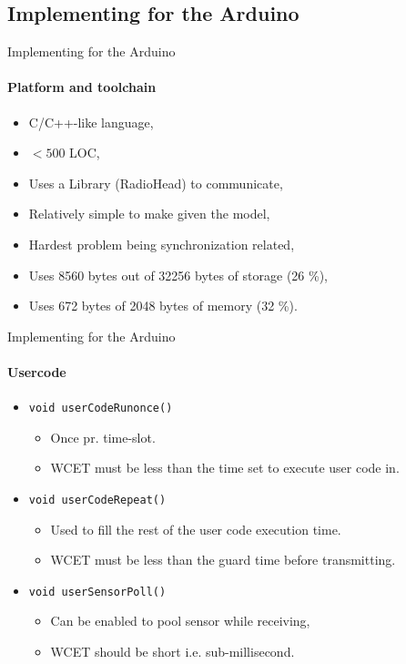     \subsection{Implementing for the Arduino}
    \begin{frame}[t]{Implementing for the Arduino}\framesubtitle{Platform and toolchain}
        \begin{itemize}
            \item C/C++-like language,
            \item $< 500$ LOC,
            \item Uses a Library (RadioHead) to communicate,
            \item Relatively simple to make given the model,
            \item Hardest problem being synchronization related,
            \item Uses 8560 bytes out of 32256 bytes of storage (26 \%),
            \item Uses 672 bytes of 2048 bytes of memory (32 \%).
        \end{itemize}

    \end{frame}
    \begin{frame}[t]{Implementing for the Arduino}\framesubtitle{Usercode}
        \begin{itemize}
            \item \texttt{void userCodeRunonce()}
            \begin{itemize}
                \item Once pr. time-slot.
                \item WCET must be less than the time set to execute user code in.
            \end{itemize}
            \item \texttt{void userCodeRepeat()}
            \begin{itemize}
                \item Used to fill the rest of the user code execution time.
                \item WCET must be less than the guard time before transmitting.
            \end{itemize}
            \item \texttt{void userSensorPoll()}
            \begin{itemize}
                \item Can be enabled to pool sensor while receiving,
                \item WCET should be short i.e. sub-millisecond. 
            \end{itemize}
        \end{itemize}

    \end{frame}

